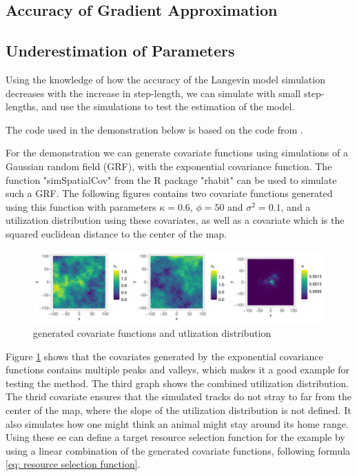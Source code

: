 \subsection{Accuracy of Gradient Approximation}



\subsection{Underestimation of Parameters}
Using the knowledge of how the accuracy of the Langevin model simulation decreases with the increase in step-length, we can simulate with small step-lengths, and use the simulations to test the estimation of the model. 



The code used in the demonstration below is based on the code from \cite{michelot_langevin_2019}.

For the demonstration we can generate covariate functions using simulations of a Gaussian random field (GRF), with the exponential covariance function. The function "simSpatialCov" from the R package "rhabit" \cite{michelot_langevin_2019} can be used to simulate such a GRF. The following figures contains two covariate functions generated using this function with parameters $\kappa = 0.6$, $\phi = 50$ and $\sigma^2 = 0.1$, and a utilization distribution using these covariates, as well as a covariate which is the squared euclidean distance to the center of the map.


\begin{figure}[H]
    \centering
    \includegraphics[width=\linewidth]{Images/example1/sim2cov.pdf}
    \caption[example 1 covariates]{generated covariate functions and utlization distribution}
    \label{fig:example_1_covariates}
\end{figure}

Figure \ref{fig:example_1_covariates} shows that the covariates generated by the exponential covariance functions contains multiple peaks and valleys, which makes it a good example for testing the method. The third graph shows the combined utilization distribution. The thrid covariate ensures that the simulated tracks do not stray to far from the center of the map, where the slope of the utilization distribution is not defined. It also simulates how one might think an animal might stay around its home range. Using these ee can define a target resource selection function for the example by using a linear combination of the generated covariate functions, following formula \ref{eq: resource selection function}. 

